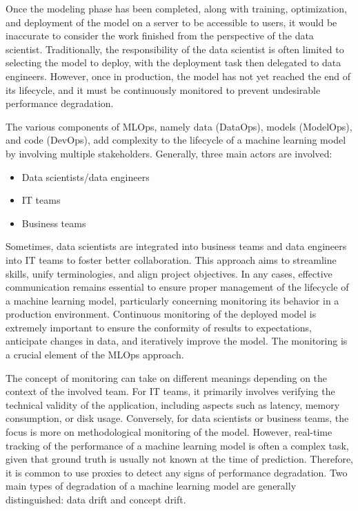 Once the modeling phase has been completed, along with training, optimization, and deployment of the model on a server to be accessible to users, it would be inaccurate to consider the work finished from the perspective of the data scientist. Traditionally, the responsibility of the data scientist is often limited to selecting the model to deploy, with the deployment task then delegated to data engineers. However, once in production, the model has not yet reached the end of its lifecycle, and it must be continuously monitored to prevent undesirable performance degradation.

The various components of MLOps, namely data (DataOps), models (ModelOps), and code (DevOps), add complexity to the lifecycle of a machine learning model by involving multiple stakeholders. Generally, three main actors are involved:

\begin{itemize}
    \item Data scientists/data engineers
    \item IT teams
    \item Business teams
\end{itemize}

Sometimes, data scientists are integrated into business teams and data engineers into IT teams to foster better collaboration. This approach aims to streamline skills, unify terminologies, and align project objectives. In any cases, effective communication remains essential to ensure proper management of the lifecycle of a machine learning model, particularly concerning monitoring its behavior in a production environment. Continuous monitoring of the deployed model is extremely important to ensure the conformity of results to expectations, anticipate changes in data, and iteratively improve the model. The monitoring is a crucial element of the MLOps approach.

The concept of monitoring can take on different meanings depending on the context of the involved team. For IT teams, it primarily involves verifying the technical validity of the application, including aspects such as latency, memory consumption, or disk usage. Conversely, for data scientists or business teams, the focus is more on methodological monitoring of the model. However, real-time tracking of the performance of a machine learning model is often a complex task, given that ground truth is usually not known at the time of prediction. Therefore, it is common to use proxies to detect any signs of performance degradation. Two main types of degradation of a machine learning model are generally distinguished: data drift and concept drift.

